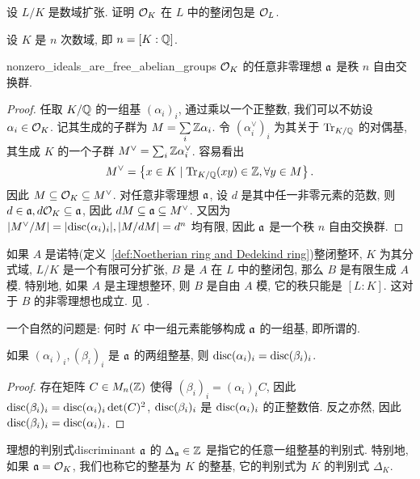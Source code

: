 \begin{exercise}
设 $L/K$ 是数域扩张. 证明 ${\mathcal{O}}_K$ 在 $L$ 中的整闭包是 ${\mathcal{O}}_L$.
\end{exercise}

设 $K$ 是 $n$ 次数域, 即 $n=[K:{\mathbb{Q}}]$.
\begin{theorem}{}{nonzero_ideals_are_free_abelian_groups}
${\mathcal{O}}_K$ 的任意非零理想 ${\mathfrak{a}}$ 是秩 $n$ 自由交换群.
\end{theorem}
\begin{proof}
任取 $K/{\mathbb{Q}}$ 的一组基 $(\alpha_i)_i$, 通过乘以一个正整数, 我们可以不妨设 $\alpha_i\in{\mathcal{O}}_K$. 记其生成的子群为 $M=\sum\limits_i {\mathbb{Z}}\alpha_i$. 令 $(\alpha_i^\vee)_i$ 为其关于 ${\mathrm{Tr}}_{K/{\mathbb{Q}}}$ 的对偶基, 其生成 $K$ 的一个子群 $M^\vee=\sum_i {\mathbb{Z}}\alpha_i^\vee$. 容易看出
  \[M^\vee=\left\{x\in K\mid {\mathrm{Tr}}_{K/{\mathbb{Q}}}(xy)\in{\mathbb{Z}},\forall y\in M\right\}.\]
因此 $M\subseteq {\mathcal{O}}_K\subseteq M^\vee$. 对任意非零理想 ${\mathfrak{a}}$, 设 $d$ 是其中任一非零元素的范数, 则 $d\in {\mathfrak{a}},d{\mathcal{O}}_K\subseteq {\mathfrak{a}}$, 因此 $dM\subseteq {\mathfrak{a}}\subseteq M^\vee$. 又因为 $|M^\vee/M|=|{\mathrm{disc}}(\alpha_i)_i|,|M/dM|=d^n$ 均有限, 因此 ${\mathfrak{a}}$ 是一个秩 $n$ 自由交换群.
\end{proof}

\begin{remark}\label{rem:integral_closure_over_pid_admits_basis}
如果 $A$ 是诺特(定义~\ref{def:Noetherian ring and Dedekind ring})整闭整环, $K$ 为其分式域, $L/K$ 是一个有限可分扩张, $B$ 是 $A$ 在 $L$ 中的整闭包, 那么 $B$ 是有限生成 $A$ 模. 特别地, 如果 $A$ 是主理想整环, 则 $B$ 是自由 $A$ 模, 它的秩只能是 $[L:K]$. 这对于 $B$ 的非零理想也成立. 见 \cite[I \S2, Theorem~1]{Lang1994}.
\end{remark}

一个自然的问题是: 何时 $K$ 中一组元素能够构成 ${\mathfrak{a}}$ 的一组基, 即所谓的.

\begin{proposition}{}{}
如果 $(\alpha_i)_i,(\beta_i)_i$ 是 ${\mathfrak{a}}$ 的两组整基, 则 ${\mathrm{disc}}(\alpha_i)_i={\mathrm{disc}}(\beta_i)_i$.
\end{proposition}
\begin{proof}
存在矩阵 $C\in M_n({\mathbb{Z}})$ 使得 $(\beta_i)_i=(\alpha_i)_i C$, 因此 ${\mathrm{disc}}(\beta_i)_i={\mathrm{disc}}(\alpha_i)_i\det(C)^2$, ${\mathrm{disc}}(\beta_i)_i$ 是 ${\mathrm{disc}}(\alpha_i)_i$ 的正整数倍. 反之亦然, 因此 ${\mathrm{disc}}(\beta_i)_i={\mathrm{disc}}(\alpha_i)_i$.
\end{proof}

\begin{definition}{理想的判别式}{discriminant}
${\mathfrak{a}}$ 的 $\Delta_{\mathfrak{a}}\in{\mathbb{Z}}$ 是指它的任意一组整基的判别式. 特别地, 如果 ${\mathfrak{a}}={\mathcal{O}}_K$, 我们也称它的整基为 $K$ 的整基, 它的判别式为 $K$ 的判别式 $\Delta_K$.
\end{definition}

